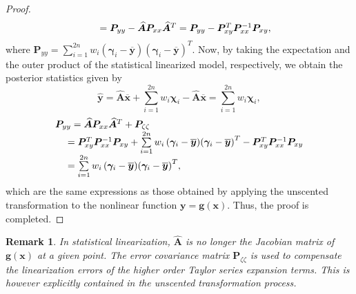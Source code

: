 \documentclass[10pt]{IEEEtran}
\newtheorem*{remark}{Remark}
\begin{document}
\begin{proof}
\begin{equation}
\begin{array}{l}
{\rm{ \quad  }} = {\bm{P}_{yy}} - \bm{\widehat A}{\bm{P}_{xx}}{\bm{\widehat A}^T} = {\bm{P}_{yy}} - \bm{P}_{xy}^T\bm{P}_{xx}^{ - 1}{\bm{P}_{xy}},
\end{array}
\label{Eq:statistical_linearization_covariance_matrix}
\end{equation}
where ${\bm{P}_{yy}} = \sum\limits_{i = 1}^{2n} {{w_i}\left( {{\bm{\gamma}_i} - \bm{\overline y}} \right)} {\left( {{\bm{\gamma}_i} - \bm{\overline y}} \right)^T}$.
Now, by taking the expectation and the outer product of the statistical linearized model, respectively, we obtain the posterior statistics given by
\begin{equation}
\bm{\widehat y}=\bm{\widehat A}\bm{\overline x}+\sum\limits_{i = 1}^{2n} {{w_i}{\bm{\chi} _i}}-\bm{\widehat A}\bm{\overline x}=\sum\limits_{i = 1}^{2n} {{w_i}{\bm{\chi} _i}},
\label{Eq:statistical_linearization_posterior_mean_statistics}
\end{equation}
\begin{equation}
\begin{array}{l}
{\bm{P}_{yy}} = \bm{\widehat A}{\bm{P}_{xx}}{\bm{\widehat A}^T} + {\bm{P}_{\zeta \zeta }}\\
{\rm{ \quad   }} = \bm{P}_{xy}^T\bm{P}_{xx}^{ - 1}{\bm{P}_{xy}} + \sum\limits_{i = 1}^{2n} {{w_i}\left( {{\bm{\gamma}_i} - \bm{\overline y} } \right)} {\left( {{\bm{\gamma}_i} - \bm{\overline y }} \right)^T} - \bm{P}_{xy}^T\bm{P}_{xx}^{ - 1}{\bm{P}_{xy}}\\
{\rm{ \quad   }} = \sum\limits_{i = 1}^{2n} {{w_i}\left( {{\bm{\gamma}_i} - \bm{\overline y} } \right)} {\left( {{\bm{\gamma}_i} - \bm{\overline y }} \right)^T},
\end{array}
\label{Eq:statistical_linearization_posterior_covariance_statistics}
\end{equation}
which are the same expressions as those obtained by applying the unscented transformation to the nonlinear function $\bm{y}=\bm{g}(\bm{x})$. Thus, the proof is completed.
\end{proof}
\begin{remark}
In statistical linearization, $\bm{\widehat A}$ is no longer the Jacobian matrix of $\bm{g}(\bm{x})$ at a given point. The error covariance matrix $\bm{P}_{\zeta\zeta}$ is used to compensate the linearization errors of the higher order Taylor series expansion terms. This is however explicitly contained in the unscented transformation process.
\end{remark}
\end{document}
